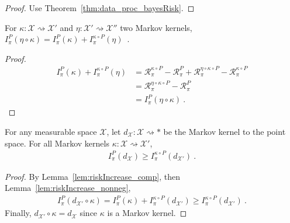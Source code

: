 \begin{proof}%
{}
Use Theorem~\ref{thm:data_proc_bayesRisk}.
\end{proof}

\begin{lemma}
  \label{lem:riskIncrease_comp}
  For $\kappa : \mathcal X \rightsquigarrow \mathcal X'$ and $\eta : \mathcal X' \rightsquigarrow \mathcal X''$ two Markov kernels,
  $I^P_\pi(\eta \circ \kappa) = I^P_\pi(\kappa) + I^{\kappa \circ P}_\pi(\eta)$~.
\end{lemma}

\begin{proof}%
\uses{}
\begin{align*}
I^P_\pi(\kappa) + I^{\kappa \circ P}_\pi(\eta)
&= \mathcal R^{\kappa \circ P}_\pi - \mathcal R^{P}_\pi + \mathcal R^{\eta \circ \kappa \circ P}_\pi - \mathcal R^{\kappa \circ P}_\pi
\\
&= \mathcal R^{\eta \circ \kappa \circ P}_\pi - \mathcal R^{P}_\pi
\\
&= I^P_\pi(\eta \circ \kappa)
\: .
\end{align*}
\end{proof}

\begin{lemma}
  \label{lem:riskIncrease_comp_del}
  \mathlibok
  For any measurable space $\mathcal X$, let $d_{\mathcal X} : \mathcal X \rightsquigarrow *$ be the Markov kernel to the point space.
  For all Markov kernels $\kappa : \mathcal X \rightsquigarrow \mathcal X'$,
  \begin{align*}
  I_\pi^P(d_{\mathcal X}) \ge I_\pi^{\kappa \circ P}(d_{\mathcal X'}) \: .
  \end{align*}
\end{lemma}

\begin{proof}\mathlibok
{}
By Lemma~\ref{lem:riskIncrease_comp}, then Lemma~\ref{lem:riskIncrease_nonneg},
\begin{align*}
I_\pi^P(d_{\mathcal X'} \circ \kappa)
= I^P_\pi(\kappa) + I^{\kappa \circ P}_\pi(d_{\mathcal X'})
\ge I_\pi^{\kappa \circ P}(d_{\mathcal X'})
\: .
\end{align*}
Finally, $d_{\mathcal X'} \circ \kappa = d_{\mathcal X}$ since $\kappa$ is a Markov kernel.
\end{proof}





